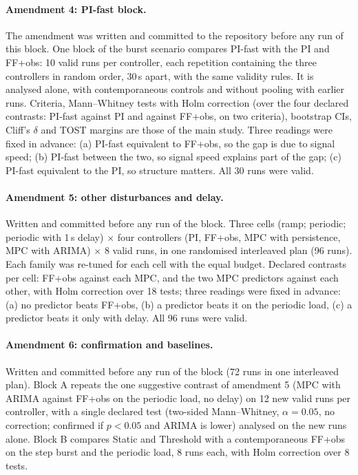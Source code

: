 \documentclass[smallextended]{svjour3}
\begin{document}
\paragraph{Amendment 4: PI-fast block.} The amendment was written and committed to the repository before any run of this block. One block of the burst scenario compares PI-fast with the PI and FF+obs: 10 valid runs per controller, each repetition containing the three controllers in random order, 30\,s apart, with the same validity rules. It is analysed alone, with contemporaneous controls and without pooling with earlier runs. Criteria, Mann--Whitney tests with Holm correction (over the four declared contrasts: PI-fast against PI and against FF+obs, on two criteria), bootstrap CIs, Cliff's $\delta$ and TOST margins are those of the main study. Three readings were fixed in advance: (a) PI-fast equivalent to FF+obs, so the gap is due to signal speed; (b) PI-fast between the two, so signal speed explains part of the gap; (c) PI-fast equivalent to the PI, so structure matters. All 30 runs were valid.
\paragraph{Amendment 5: other disturbances and delay.} Written and committed before any run of the block. Three cells (ramp; periodic; periodic with 1\,s delay) $\times$ four controllers (PI, FF+obs, MPC with persistence, MPC with ARIMA) $\times$ 8 valid runs, in one randomised interleaved plan (96 runs). Each family was re-tuned for each cell with the equal budget. Declared contrasts per cell: FF+obs against each MPC, and the two MPC predictors against each other, with Holm correction over 18 tests; three readings were fixed in advance: (a) no predictor beats FF+obs, (b) a predictor beats it on the periodic load, (c) a predictor beats it only with delay. All 96 runs were valid.
\paragraph{Amendment 6: confirmation and baselines.} Written and committed before any run of the block (72 runs in one interleaved plan). Block A repeats the one suggestive contrast of amendment 5 (MPC with ARIMA against FF+obs on the periodic load, no delay) on 12 new valid runs per controller, with a single declared test (two-sided Mann--Whitney, $\alpha=0.05$, no correction; confirmed if $p<0.05$ and ARIMA is lower) analysed on the new runs alone. Block B compares Static and Threshold with a contemporaneous FF+obs on the step burst and the periodic load, 8 runs each, with Holm correction over 8 tests.
\end{document}
